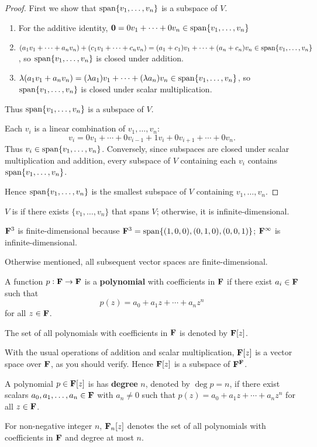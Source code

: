 \begin{proof}
First we show that $\operatorname{span}\{v_1,\dots,v_n\}$ is a subspace of $V$.
\begin{enumerate}[label=(\roman*)]
\item For the additive identity, $\vb{0}=0v_1+\cdots+0v_n\in\operatorname{span}\{v_1,\dots,v_n\}$
\item $(a_1v_1+\cdots+a_nv_n)+(c_1v_1+\cdots+c_nv_n)=(a_1+c_1)v_1+\cdots+(a_n+c_n)v_n\in\operatorname{span}\{v_1,\dots,v_n\}$, so $\operatorname{span}\{v_1,\dots,v_n\}$ is closed under addition.
\item $\lambda(a_1v_1+a_nv_n)=(\lambda a_1)v_1+\cdots+(\lambda a_n)v_n\in\operatorname{span}\{v_1,\dots,v_n\}$, so $\operatorname{span}\{v_1,\dots,v_n\}$ is closed under scalar multiplication.
\end{enumerate}
Thus $\operatorname{span}\{v_1,\dots,v_n\}$ is a subspace of $V$.

Each $v_i$ is a linear combination of $v_1,\dots,v_n$:
\[v_i=0v_1+\cdots+0v_{i-1}+1v_i+0v_{i+1}+\cdots+0v_n.\]
Thus $v_i\in\operatorname{span}\{v_1,\dots,v_n\}$. Conversely, since subspaces are closed under scalar multiplication and addition, every subspace of $V$ containing each $v_i$ contains $\operatorname{span}\{v_1,\dots,v_n\}$.

Hence $\operatorname{span}\{v_1,\dots,v_n\}$ is the smallest subspace of $V$ containing $v_1,\dots,v_n$.
\end{proof}

\begin{definition}
$V$ is  if there exists $\{v_1,\dots,v_n\}$ that spans $V$; otherwise, it is infinite-dimensional.
\end{definition}

\begin{example}
$\mathbf F^3$ is finite-dimensional because $\mathbf F^3=\operatorname{span}\{(1,0,0),(0,1,0),(0,0,1)\}$; $\mathbf F^\infty$ is infinite-dimensional.
\end{example}

Otherwise mentioned, all subsequent vector spaces are finite-dimensional.

\begin{example}[Polynomial]
A function $p:\mathbf F\to\mathbf F$ is a \textbf{polynomial} with coefficients in $\mathbf F$ if there exist $a_i\in\mathbf F$ such that
\[p(z)=a_0+a_1z+\cdots+a_nz^n\]
for all $z\in\mathbf F$.

The set of all polynomials with coefficients in $\mathbf F$ is denoted by $\mathbf F[z]$.

With the usual operations of addition and scalar multiplication, $\mathbf F[z]$ is a vector space over $\mathbf F$, as you should verify. Hence $\mathbf F[z]$ is a subspace of $\mathbf F^\mathbf F$.

A polynomial $p\in\mathbf F[z]$ is has \textbf{degree} $n$, denoted by $\deg p=n$, if there exist scalars $a_0,a_1,\dots,a_n\in\mathbf F$ with $a_n\neq0$ such that $p(z)=a_0+a_1z+\cdots+a_nz^n$ for all $z\in\mathbf F$.

For non-negative integer $n$, $\mathbf F_n[z]$ denotes the set of all polynomials with coefficients in $\mathbf F$ and degree at most $n$.
\end{example}

